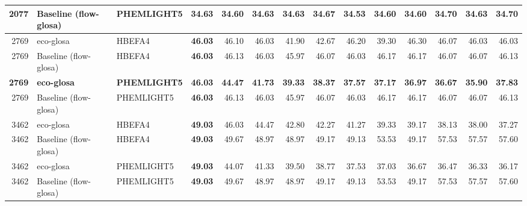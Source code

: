 \begin{table}[htb]
{\begin{tabular}{r l l r *{10}{r}}
    2077 & Baseline (\ac{flow-glosa})  & PHEMLIGHT5       & \textbf{34.63} & 34.60 & 34.63 & 34.63 & 34.67 & 34.53 & 34.60 & 34.60 & 34.70 & 34.63 & 34.70 \\
    \midrule
    2769 & \ac{eco-glosa}              & HBEFA4           & \textbf{46.03} & 46.10 & 46.03 & 41.90 & 42.67 & 46.20 & 39.30 & 46.30 & 46.07 & 46.03 & 46.03 \\
    2769 & Baseline (\ac{flow-glosa})  & HBEFA4           & \textbf{46.03} & 46.13 & 46.03 & 45.97 & 46.07 & 46.03 & 46.17 & 46.17 & 46.07 & 46.07 & 46.13 \\
    \textbf{2769} & \textbf{\ac{eco-glosa}} & \textbf{PHEMLIGHT5} & \textbf{46.03} & \textbf{44.47} & \textbf{41.73} & \textbf{39.33} & \textbf{38.37} & \textbf{37.57} & \textbf{37.17} & \textbf{36.97} & \textbf{36.67} & \textbf{35.90} & \textbf{37.83} \\
    2769 & Baseline (\ac{flow-glosa})  & PHEMLIGHT5       & \textbf{46.03} & 46.13 & 46.03 & 45.97 & 46.07 & 46.03 & 46.17 & 46.17 & 46.07 & 46.07 & 46.13 \\
    \midrule
    3462 & \ac{eco-glosa}              & HBEFA4           & \textbf{49.03} & 46.03 & 44.47 & 42.80 & 42.27 & 41.27 & 39.33 & 39.17 & 38.13 & 38.00 & 37.27 \\
    3462 & Baseline (\ac{flow-glosa})  & HBEFA4           & \textbf{49.03} & 49.67 & 48.97 & 48.97 & 49.17 & 49.13 & 53.53 & 49.17 & 57.53 & 57.57 & 57.60 \\
    3462 & \ac{eco-glosa}              & PHEMLIGHT5       & \textbf{49.03} & 44.07 & 41.33 & 39.50 & 38.77 & 37.53 & 37.03 & 36.67 & 36.47 & 36.33 & 36.17 \\
    3462 & Baseline (\ac{flow-glosa})  & PHEMLIGHT5       & \textbf{49.03} & 49.67 & 48.97 & 48.97 & 49.17 & 49.13 & 53.53 & 49.17 & 57.53 & 57.57 & 57.60 \\
    \bottomrule
  \end{tabular}%
  }
\end{table}
